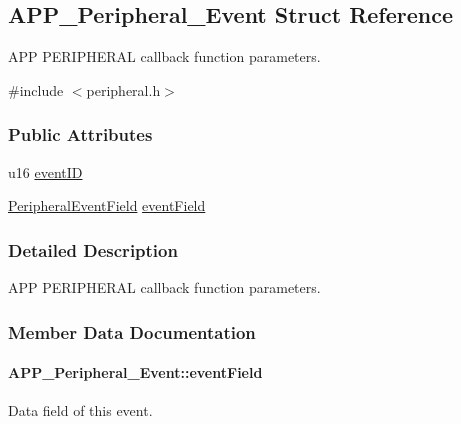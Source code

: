 \hypertarget{struct_a_p_p___peripheral___event}{}\subsection{A\+P\+P\+\_\+\+Peripheral\+\_\+\+Event Struct Reference}
\label{struct_a_p_p___peripheral___event}


A\+PP P\+E\+R\+I\+P\+H\+E\+R\+AL callback function parameters.  




{\ttfamily \#include $<$peripheral.\+h$>$}

\subsubsection*{Public Attributes}
\begin{DoxyCompactItemize}
\item 
u16 \hyperlink{struct_a_p_p___peripheral___event_a941104e706ef4c746ed8e5bbf9eb393a}{event\+ID}
\item 
\hyperlink{union_peripheral_event_field}{Peripheral\+Event\+Field} \hyperlink{struct_a_p_p___peripheral___event_ae3605be267ec6b232a3ff832019d0cdb}{event\+Field}
\end{DoxyCompactItemize}


\subsubsection{Detailed Description}
A\+PP P\+E\+R\+I\+P\+H\+E\+R\+AL callback function parameters. 

\subsubsection{Member Data Documentation}
\paragraph[{\texorpdfstring{event\+Field}{eventField}}]{ A\+P\+P\+\_\+\+Peripheral\+\_\+\+Event\+::event\+Field}\hypertarget{struct_a_p_p___peripheral___event_ae3605be267ec6b232a3ff832019d0cdb}{}\label{struct_a_p_p___peripheral___event_ae3605be267ec6b232a3ff832019d0cdb}
Data field of this event. 
